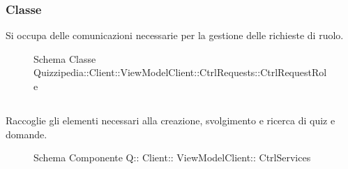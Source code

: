 \subsubsection{Classe }
Si occupa delle comunicazioni necessarie per la gestione delle richieste di ruolo.
\begin{figure}[H]
\centering
\noindent{}
\caption[Schema Classe CtrlRequestRole]{Schema Classe Quizzipedia::Client::ViewModelClient::CtrlRequests::CtrlRequestRole}
\end{figure}
\subsection{}
Raccoglie gli elementi necessari alla creazione, svolgimento e ricerca di quiz e domande.
\begin{figure}[H]
\centering
\noindent{}
\caption[Schema Componente Quizzipedia::Client::ViewModelClient::CtrlServices]{Schema Componente Q:: Client:: ViewModelClient:: CtrlServices}
\end{figure}
